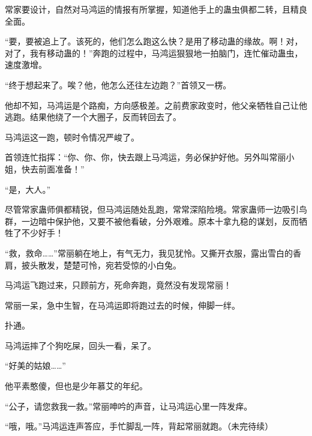 \begin{this_body}
常家要设计，自然对马鸿运的情报有所掌握，知道他手上的蛊虫俱都二转，且精良全面。

“要，要被追上了。该死的，他们怎么跑这么快？是用了移动蛊的缘故。啊！对，对了，我有移动蛊的！”奔跑的过程中，马鸿运狠狠地一拍脑门，连忙催动蛊虫，速度激增。

“终于想起来了。唉？他，他怎么还往左边跑？”首领又一楞。

他却不知，马鸿运是个路痴，方向感极差。之前费家政变时，他父亲牺牲自己让他逃跑。结果他绕了一个大圈子，反而转回去了。

马鸿运这一跑，顿时令情况严峻了。

首领连忙指挥：“你、你、你，快去跟上马鸿运，务必保护好他。另外叫常丽小姐，快去前面准备！”

“是，大人。”

尽管常家蛊师俱都精锐，但马鸿运随处乱跑，常常深陷险境。常家蛊师一边吸引鸟群，一边暗中保护他，又要不被他看破，分外艰难。原本十拿九稳的谋划，反而牺牲了不少好手！

“救，救命……”常丽躺在地上，有气无力，我见犹怜。又撕开衣服，露出雪白的香肩，披头散发，楚楚可怜，宛若受惊的小白兔。

马鸿运飞跑过来，只顾前方，死命奔跑，竟然没有发现常丽！

常丽一呆，急中生智，在马鸿运即将跑过去的时候，伸脚一绊。

扑通。

马鸿运摔了个狗吃屎，回头一看，呆了。

“好美的姑娘……”

他平素憨傻，但也是少年慕艾的年纪。

“公子，请您救我一救。”常丽呻吟的声音，让马鸿运心里一阵发痒。

“哦，哦。”马鸿运连声答应，手忙脚乱一阵，背起常丽就跑。（未完待续）

\end{this_body}

